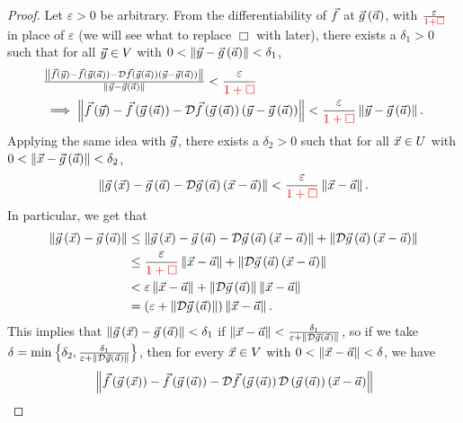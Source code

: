 \documentclass[main.tex]{subfiles}
\begin{document}
\begin{proof}
    Let $\varepsilon > 0$ be arbitrary. From the differentiability of $\vec{f}$ at $\vec{g}\left( \vec{a} \right)$, with $\frac{\varepsilon}{\begingroup\color{red}1 + \Box\endgroup}$ in place of $\varepsilon$ (we will see what to replace $\Box$ with later), there exists a $\delta_1 > 0$ such that for all $\vec{y}\in V$ with $0 < \left\lVert \vec{y} - \vec{g}\left( \vec{a} \right) \right\rVert < \delta_1$,
    \begin{align*}
        &\tfrac{\norm{\vf\parens{\vy} - \vf\parens{\vg\parens{\va}} - \mathcal{D}\vf\parens{\vg\parens{\va}}\parens{\vy - \vg\parens{\va}}}}{\norm{\vy - \vg\parens{\va}}} < \frac{\varepsilon}{\begingroup\color{red}1 + \Box\endgroup} \\
        &\implies \norm{\vf\parens{\vy} - \vf\parens{\vg\parens{\va}} - \mathcal{D}\vf\parens{\vg\parens{\va}}\parens{\vy - \vg\parens{\va}}} < \frac{\varepsilon}{\begingroup\color{red}1 + \Box\endgroup}\norm{\vy - \vg\parens{\va}}.
    \end{align*}
    Applying the same idea with $\vec{g}$, there exists a $\delta_2 > 0$ such that for all $\vec{x}\in U$ with $0 < \left\lVert \vec{x} - \vec{g}\left( \vec{a} \right) \right\rVert < \delta_2$,
    \[\norm{\vg\parens{\vx} - \vg\parens{\va} - \mathcal{D}\vg\parens{\va}\parens{\vx - \va}} < \frac{\varepsilon}{\begingroup\color{red}1 + \Box\endgroup}\norm{\vx - \va}.\]
    In particular, we get that
    \begin{align*}
        \norm{\vg\parens{\vx} - \vg\parens{\va}} &\le \norm{\vg\parens{\vx} - \vg\parens{\va} - \mathcal{D}\vg\parens{\va}\parens{\vx - \va}} + \norm{\mathcal{D}\vg\parens{\va}\parens{\vx - \va}} \\
        &\le \frac{\varepsilon}{\begingroup\color{red}1 + \Box\endgroup}\norm{\vx - \va} + \norm{\mathcal{D}\vg\parens{\va}\parens{\vx - \va}} \\
        &< \varepsilon\norm{\vx - \va} + \norm{\mathcal{D}\vg\parens{\va}}\norm{\vx - \va} \\
        &= \parens{\varepsilon + \norm{\mathcal{D}\vg\parens{\va}}}\norm{\vx - \va}.
    \end{align*}
    This implies that $\left\lVert \vec{g}\left( \vec{x} \right) - \vec{g}\left( \vec{a} \right) \right\rVert 
 <\delta_1$ if $\left\lVert \vec{x} - \vec{a} \right\rVert < \frac{\delta_1}{\varepsilon + \left\lVert \mathcal{D}\vec{g}\left( \vec{a} \right) \right\rVert}$, so if we take $\delta = \min\left\{ \delta_2, \frac{\delta_1}{\varepsilon + \left\lVert \mathcal{D}\vec{g}\left( \vec{a} \right) \right\rVert} \right\}$, then for every $\vec{x}\in V$ with $0 < \left\lVert \vec{x} - \vec{a} \right\rVert < \delta$, we have
    \begin{align*}
        &\norm{\vf\parens{\vg\parens{\vx}} - \vf\parens{\vg\parens{\va}} - \mathcal{D}\vf\parens{\vg\parens{\va}}\mathcal{D}\parens{\vg\parens{\va}}\parens{\vx - \va}} \\

\end{align*}
\end{proof}
\end{document}
